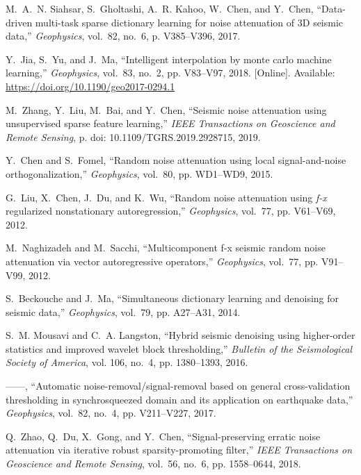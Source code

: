 \begin{thebibliography}{00}
M.~A.~N. Siahsar, S.~Gholtashi, A.~R. Kahoo, W.~Chen, and Y.~Chen,
  ``Data-driven multi-task sparse dictionary learning for noise attenuation of
  3{D} seismic data,'' \emph{Geophysics}, vol.~82, no.~6, p. V385–V396, 2017.

Y.~Jia, S.~Yu, and J.~Ma, ``Intelligent interpolation by monte carlo machine
  learning,'' \emph{Geophysics}, vol.~83, no.~2, pp. V83--V97, 2018. [Online].
  Available: \url{https://doi.org/10.1190/geo2017-0294.1}


M.~Zhang, Y.~Liu, M.~Bai, and Y.~Chen, ``Seismic noise attenuation using
  unsupervised sparse feature learning,'' \emph{IEEE Transactions on Geoscience
  and Remote Sensing}, p. doi: 10.1109/TGRS.2019.2928715, 2019.

Y.~Chen and S.~Fomel, ``Random noise attenuation using local signal-and-noise
  orthogonalization,'' \emph{Geophysics}, vol.~80, pp. WD1--WD9, 2015.

G.~Liu, X.~Chen, J.~Du, and K.~Wu, ``Random noise attenuation using \emph{f-x}
  regularized nonstationary autoregression,'' \emph{Geophysics}, vol.~77, pp.
  V61--V69, 2012.

M.~Naghizadeh and M.~Sacchi, ``Multicomponent f-x seismic random noise
  attenuation via vector autoregressive operators,'' \emph{Geophysics},
  vol.~77, pp. V91--V99, 2012.

S.~Beckouche and J.~Ma, ``Simultaneous dictionary learning and denoising for
  seismic data,'' \emph{Geophysics}, vol.~79, pp. A27--A31, 2014.

S.~M. Mousavi and C.~A. Langston, ``Hybrid seismic denoising using higher-order
  statistics and improved wavelet block thresholding,'' \emph{Bulletin of the
  Seismological Society of America}, vol. 106, no.~4, pp. 1380--1393, 2016.

------, ``Automatic noise-removal/signal-removal based on general
  cross-validation thresholding in synchrosqueezed domain and its application
  on earthquake data,'' \emph{Geophysics}, vol.~82, no.~4, pp. V211--V227,
  2017.

Q.~Zhao, Q.~Du, X.~Gong, and Y.~Chen, ``Signal-preserving erratic noise
  attenuation via iterative robust sparsity-promoting filter,'' \emph{IEEE
  Transactions on Geoscience and Remote Sensing}, vol.~56, no.~6, pp.
  1558--0644, 2018.


\end{thebibliography}
